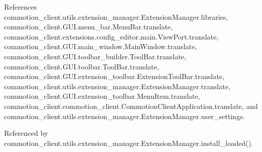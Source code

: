 References commotion\-\_\-client.\-utils.\-extension\-\_\-manager.\-Extension\-Manager.\-libraries, commotion\-\_\-client.\-G\-U\-I.\-menu\-\_\-bar.\-Menu\-Bar.\-translate, commotion\-\_\-client.\-extensions.\-config\-\_\-editor.\-main.\-View\-Port.\-translate, commotion\-\_\-client.\-G\-U\-I.\-main\-\_\-window.\-Main\-Window.\-translate, commotion\-\_\-client.\-G\-U\-I.\-toolbar\-\_\-builder.\-Tool\-Bar.\-translate, commotion\-\_\-client.\-G\-U\-I.\-toolbar.\-Tool\-Bar.\-translate, commotion\-\_\-client.\-G\-U\-I.\-extension\-\_\-toolbar.\-Extension\-Tool\-Bar.\-translate, commotion\-\_\-client.\-utils.\-extension\-\_\-manager.\-Extension\-Manager.\-translate, commotion\-\_\-client.\-G\-U\-I.\-extension\-\_\-toolbar.\-Menu\-Item.\-translate, commotion\-\_\-client.\-commotion\-\_\-client.\-Commotion\-Client\-Application.\-translate, and commotion\-\_\-client.\-utils.\-extension\-\_\-manager.\-Extension\-Manager.\-user\-\_\-settings.



Referenced by commotion\-\_\-client.\-utils.\-extension\-\_\-manager.\-Extension\-Manager.\-install\-\_\-loaded().


